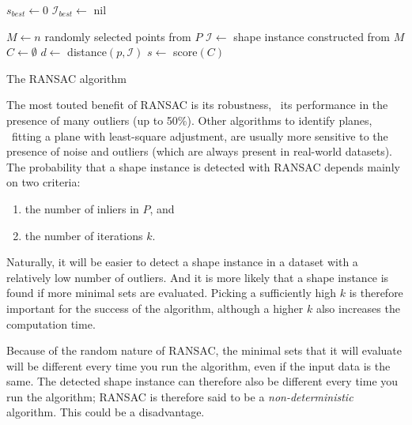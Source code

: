 \begin{algorithm}
	$s_{best} \leftarrow 0$\;
	$\mathcal{I}_{best} \leftarrow$ nil\;

	{
		$M \leftarrow n$ randomly selected points from $P$\;
		$\mathcal{I} \leftarrow$ shape instance constructed from $M$\;
		$C \leftarrow \emptyset$ \;
		{
			$d \leftarrow$ distance$(p,\mathcal{I})$\;
		}
		$s \leftarrow$ score$(C)$\;
	}
	\caption{The RANSAC algorithm}%
\label{algo:ransac}
\end{algorithm}




The most touted benefit of RANSAC is its robustness, \ie\ its performance in the presence of many outliers (up to 50\%). 
Other algorithms to identify planes, \eg\ fitting a plane with least-square adjustment, are usually more sensitive to the presence of noise and outliers (which are always present in real-world datasets).
The probability that a shape instance is detected with RANSAC depends mainly on two criteria:
\begin{enumerate}
	\item the number of inliers in $P$, and
	\item the number of iterations $k$.
\end{enumerate}
Naturally, it will be easier to detect a shape instance in a dataset with a relatively low number of outliers.
And it is more likely that a shape instance is found if more minimal sets are evaluated.
Picking a sufficiently high $k$ is therefore important for the success of the algorithm, although a higher $k$ also increases the computation time.

Because of the random nature of RANSAC, the minimal sets that it will evaluate will be different every time you run the algorithm, even if the input data is the same.
The detected shape instance can therefore also be different every time you run the algorithm; RANSAC is therefore said to be a \emph{non-deterministic} algorithm.
This could be a disadvantage.

